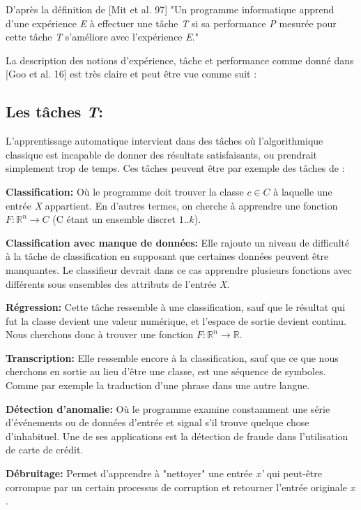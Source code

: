 	D'après la définition de [Mit et al. 97] "Un programme informatique apprend d'une expérience \textit{E} à effectuer une tâche \textit{T} si sa performance \textit{P} mesurée pour cette tâche \textit{T} s'améliore avec l’expérience \textit{E}."

	La description des notions d'expérience, tâche et performance comme donné dans [Goo et al. 16] est très claire et peut être vue comme suit :

\subsection{Les tâches \textit{T}:} 
L'apprentissage automatique intervient dans des tâches où l'algorithmique classique est incapable de donner des résultats satisfaisants, ou prendrait simplement trop de temps. Ces tâches peuvent être par exemple des tâches de :

\textbf{Classification:} Où le programme doit trouver la classe $c \in C$ à laquelle une entrée \textit{X} appartient. En d'autres termes, on cherche à apprendre une fonction $F : \mathbb{R}^{n} \rightarrow C$ (C étant un ensemble discret ${1..k}$).

\textbf{Classification avec manque de données:} Elle rajoute un niveau de difficulté à la tâche de classification en supposant que certaines données peuvent être manquantes. Le classifieur devrait dans ce cas apprendre plusieurs fonctions avec différents sous ensembles des attributs de l'entrée \textit{X}.

\textbf{Régression:} Cette tâche ressemble à une classification, sauf que le résultat qui fut la classe devient une valeur numérique, et l'espace de sortie devient continu. Nous cherchons donc à trouver une fonction $F : \mathbb{R}^{n} \rightarrow \mathbb{R}$.

\textbf{Transcription:} Elle ressemble encore à la classification, sauf que ce que nous cherchons en sortie au lieu d’être une classe, est une séquence de symboles. Comme par exemple la traduction d'une phrase dans une autre langue.

\textbf{Détection d'anomalie:} Où le programme examine constamment une série d’événements ou de données d'entrée et signal s'il trouve quelque chose d'inhabituel. Une de ses applications est la détection de fraude dans l'utilisation de carte de crédit.

\textbf{Débruitage:} Permet d'apprendre à "nettoyer" une entrée \textit{x'} qui peut-être corrompue par un certain processus de corruption et retourner l'entrée originale \textit{x} .


